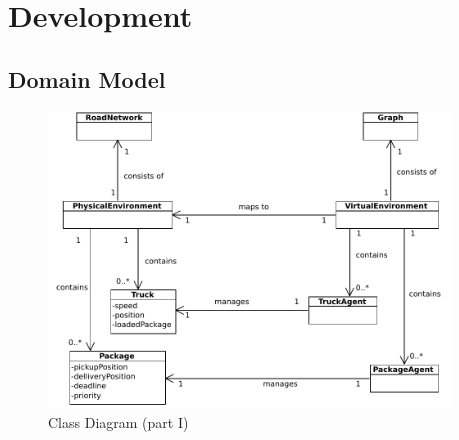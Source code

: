 \section{Development}
\subsection{Domain Model}

\begin{figure}[!h]
        \vspace{0.5pt}
        \begin{center}
                \includegraphics[width = 0.95\textwidth]{./diagrams/DomainModel.pdf}
		\end{center}
		\caption{Class Diagram (part I)}
		\label{Fig:DomainModel}
        \vspace{0.5pt}
\end{figure}

\newpage
